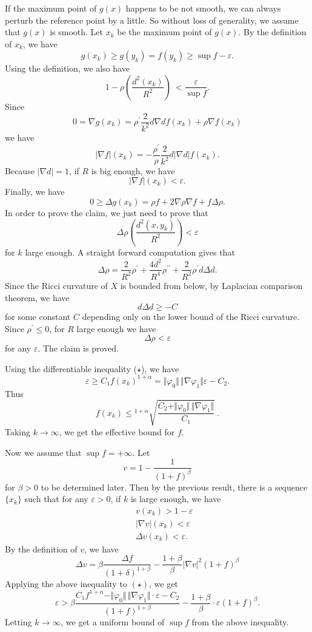 If the maximum point of $g(x) $ happens to be not smooth, we can always perturb the reference point by a little. So without loss of generality, we assume that $g(x) $ is smooth. Let $ x_k$ be the maximum point of $ g(x)$. By the definition of $ x_k$, we have 
%
\[g(x_k) \geq g (y_k) = f (y_k) \geq \sup f - \varepsilon. \]
%
Using the definition, we also have 
%
\[1 - \rho \left( \frac{d^2 (x_k) }{R^2} \right) \ < \frac{\varepsilon }{\sup f }.\]
%
Since 
%
\[ 0 = \nabla g (x_k) = \rho^\prime \frac{2}{k^2} d \nabla d f (x_k) + \rho \nabla f (x_k)\]
we have 
% 
\[ |\nabla f| (x_k)= - \frac{\rho^\prime}{\rho} \frac{2}{k^2} d | \nabla d |f (x_k).\]
%
Because $ | \nabla d | = 1$, if $R$ is big enough, we have 
%
\[ |\nabla f| (x_k) < \varepsilon. \]
%
Finally, we have 
%
\[ 0 \geq \Delta g (x_k) = \rho f + 2 \nabla \rho \nabla f + f \Delta \rho.\]
%
In order to prove the claim, we just need to prove that 
%
\[ \Delta \rho \left( \frac{d^2 (x, y_k )}{R^2} \right) < \varepsilon \]
for $k$ large enough. A straight forward computation gives that 
%
\[ \Delta \rho = \frac{2}{R^2} \rho^\prime + \frac{4d^2}{R^4} \rho^{\prime \prime} + \frac{2}{R^2} \rho^\prime d \Delta d .\]
%
Since the Ricci curvature of $X$ is bounded from below, by Laplacian comparison theorem, we have 
%
\[d \Delta d \geq -C\]
%
for some constant $C$ depending only on the lower bound of the Ricci curvature. Since $ \rho^\prime  \leq 0$, for $R$ large enough we have 
%
\[ \Delta \rho < \varepsilon \]
%
for any $ \varepsilon$. The claim is proved.

Using the differentiable inequality ($\star$), we have 
%
\[ \varepsilon \geq C_1 f (x_k) ^{1 + \alpha} = \Vert \varphi_0 \Vert \, \Vert \nabla \varphi_1 \Vert \varepsilon - C_2 .\]
%
Thus 
%
\[ f (x_k) \leq {}^{1+\alpha}\sqrt{\frac{C_2 + \Vert\varphi _0\Vert \,\Vert  \nabla \varphi _1 \Vert}{C_1}} \ .\]
%
Taking $ k \rightarrow \infty$, we get the effective bound for $f$. 

Now we assume that $ \sup f =   + \infty$. Let 
%
\[ v = 1 - \frac{1}{(1+f) ^\beta} \]
%
for $ \beta > 0 $ to be determined later. Then by the previous result, there is a sequence $ \{ x_k\} $ such that for any $ \varepsilon > 0 $, if $k$ is large enough, we have
%
\begin{eqnarray*}
&&v (x_k) > 1 - \varepsilon\\
&& |\nabla v | (x_k) < \varepsilon \\
&& \Delta v (x_k) < \varepsilon .
\end{eqnarray*}
%
By the definition of $v$, we have 
%
\[ \Delta  v = \beta \frac{\Delta f }{(1+ \delta )^{1+ \beta}} - \frac{1+\beta}{\beta} | \nabla v|^2 (1 +f )^\beta \]
%
Applying the above inequality to  $(\star)$, we get 
%
\[ \varepsilon > \beta \frac{C_1 f^{1+\alpha}- \Vert\varphi _0\Vert \,\Vert \nabla \varphi _1 \Vert \cdot \varepsilon - C_2}{(1+f ) ^{1 + \beta}} - \frac{1+\beta }{\beta} \cdot \varepsilon (1 + f)^\beta .\]
%
Letting $ k \rightarrow \infty$, we get a uniform bound of $\sup f $ from the above inequality.

